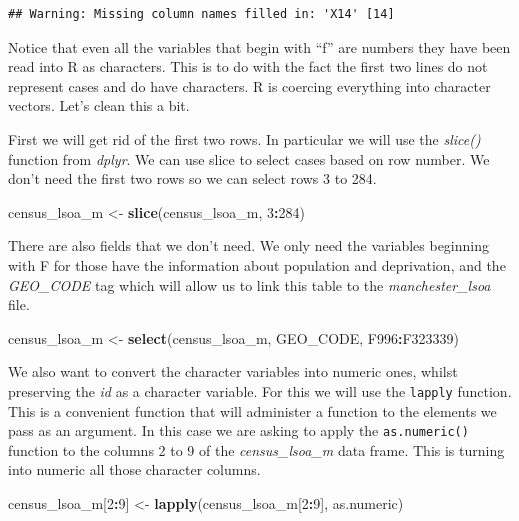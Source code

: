 \documentclass[]{book}
\newenvironment{Shaded}{\begin{snugshade}}{\end{snugshade}}
\newcommand{\DecValTok}[1]{\textcolor[rgb]{0.00,0.00,0.81}{#1}}
\newcommand{\KeywordTok}[1]{\textcolor[rgb]{0.13,0.29,0.53}{\textbf{#1}}}
\newcommand{\NormalTok}[1]{#1}
\newcommand{\OperatorTok}[1]{\textcolor[rgb]{0.81,0.36,0.00}{\textbf{#1}}}
\newcommand{\StringTok}[1]{\textcolor[rgb]{0.31,0.60,0.02}{#1}}
\begin{document}
\begin{verbatim}
## Warning: Missing column names filled in: 'X14' [14]
\end{verbatim}

Notice that even all the variables that begin with ``f'' are numbers they have been read into R as characters. This is to do with the fact the first two lines do not represent cases and do have characters. R is coercing everything into character vectors. Let's clean this a bit.

First we will get rid of the first two rows. In particular we will use the \emph{slice()} function from \emph{dplyr}. We can use slice to select cases based on row number. We don't need the first two rows so we can select rows 3 to 284.

\begin{Shaded}
\begin{Highlighting}[]
\NormalTok{census_lsoa_m <-}\StringTok{ }\KeywordTok{slice}\NormalTok{(census_lsoa_m, }\DecValTok{3}\OperatorTok{:}\DecValTok{284}\NormalTok{)}
\end{Highlighting}
\end{Shaded}

There are also fields that we don't need. We only need the variables beginning with F for those have the information about population and deprivation, and the \emph{GEO\_CODE} tag which will allow us to link this table to the \emph{manchester\_lsoa} file.

\begin{Shaded}
\begin{Highlighting}[]
\NormalTok{census_lsoa_m <-}\StringTok{ }\KeywordTok{select}\NormalTok{(census_lsoa_m, GEO_CODE, F996}\OperatorTok{:}\NormalTok{F323339)}
\end{Highlighting}
\end{Shaded}

We also want to convert the character variables into numeric ones, whilst preserving the \emph{id} as a character variable. For this we will use the \texttt{lapply} function. This is a convenient function that will administer a function to the elements we pass as an argument. In this case we are asking to apply the \texttt{as.numeric()} function to the columns 2 to 9 of the \emph{census\_lsoa\_m} data frame. This is turning into numeric all those character columns.

\begin{Shaded}
\begin{Highlighting}[]
\NormalTok{census_lsoa_m[}\DecValTok{2}\OperatorTok{:}\DecValTok{9}\NormalTok{] <-}\StringTok{ }\KeywordTok{lapply}\NormalTok{(census_lsoa_m[}\DecValTok{2}\OperatorTok{:}\DecValTok{9}\NormalTok{], as.numeric)}
\end{Highlighting}
\end{Shaded}
\end{document}
